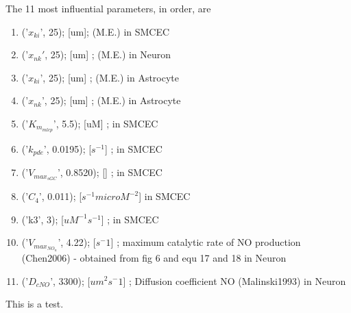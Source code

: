 \documentclass{article}
\newcommand{\commJoey}[1]{{\color{red}{\em Joey: #1}}}
\newcommand{\commTim}[1]{{\color{blue}{\em Tim: #1}}}
\begin{document}
The 11 most influential parameters, in order, are
\begin{enumerate}
\item ('$x_{ki}$', 25);  [um];  (M.E.) in SMCEC
\item ('$x_{nk}'$, 25);             [um] ;  (M.E.) in Neuron
\item ('$x_{ki}$', 25);             [um] ;  (M.E.) in Astrocyte
\item ('$x_{nk}$', 25);             [um] ;  (M.E.) in Astrocyte
\item  ('$K_{m_{mlcp}}$', 5.5);  [uM] ; in SMCEC
\item ('$k_{pde}$', 0.0195);  [$s^{-1}$] ; in SMCEC
\item  ('$V_{max_{sGC}}$', 0.8520);  [] ; in SMCEC
\item ('$C_4$', 0.011);  [$s^{-1} microM^{-2}$]  in SMCEC
\item ('k3', 3);  [$uM^{-1} s^{-1}$] ; in SMCEC
\item ('$V_{max_{NO_{n}}}$', 4.22);     [$s^-1$] ; maximum catalytic rate of NO production (Chen2006) - obtained from fig 6 and equ 17 and 18 in Neuron
\item ('$D_{cNO}$', 3300);          [$um^2 s^-1$] ; Diffusion coefficient NO (Malinski1993) in Neuron
\end{enumerate}

\commTim{Tim may insert a comment like this.}
\commJoey{Joey may insert a comment like this.}

This is a test.
\end{document}
